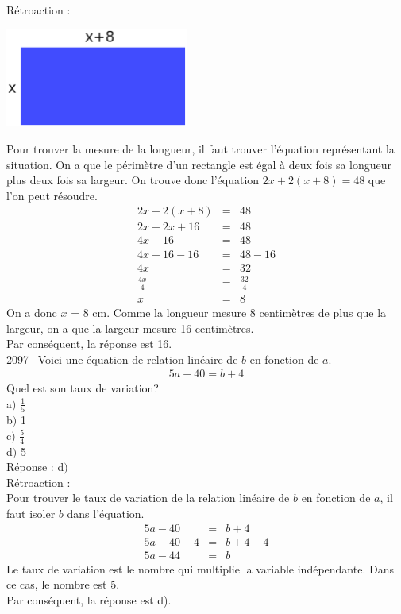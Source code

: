 \documentclass[letterpaper, 12pt]{article}
\begin{document}
R\'etroaction :
\begin{center}
 \includegraphics[width=6cm,bb=14 14 435 315]{Q2096.eps}
\end{center}
Pour trouver la mesure de la longueur, il faut trouver l'\'equation repr\'esentant la situation. On a que le p\'erim\`etre d'un rectangle est \'egal \`a deux fois sa longueur plus deux fois sa largeur. On trouve donc l'\'equation $2x+2(x+8)=48$ que l'on peut r\'esoudre.
\begin{eqnarray*}
 2x+2(x+8)&=&48\\
2x+2x+16&=&48\\
4x+16&=&48\\
4x+16-16&=&48-16\\
4x&=&32\\[2mm]
\frac{4x}{4}&=&\frac{32}{4}\\[2mm]
x&=&8
\end{eqnarray*}
On a donc $x$ = 8 cm. Comme la longueur mesure 8 centim\`etres de plus que la largeur, on a que la largeur mesure 16 centim\`etres.\\
Par cons\'equent, la r\'eponse est 16.\\

2097-- Voici une \'equation de relation lin\'eaire de $b$ en fonction de $a$.
\begin{eqnarray*}
5a - 40 = b + 4
\end{eqnarray*}
Quel est son taux de variation? \\

a$)$ $\frac{1}{5}$\\[2mm]
b$)$ 1\\[2mm]
c$)$ $\frac{5}{4}$\\[2mm]
d$)$ 5\\[2mm]

R\'eponse : d$)$\\

R\'etroaction :\\
Pour trouver le taux de variation de la relation lin\'eaire de $b$ en fonction de $a$, il faut isoler $b$ dans l'\'equation.
\begin{eqnarray*}
5a - 40  &=& b + 4\\
5a - 40  -4 &=& b + 4 -4\\
5a - 44 &=& b
\end{eqnarray*}
Le taux de variation est le nombre qui multiplie la variable ind\'ependante. Dans ce cas, le nombre est 5.\\
Par cons\'equent, la r\'eponse est d).\\
\end{document}
